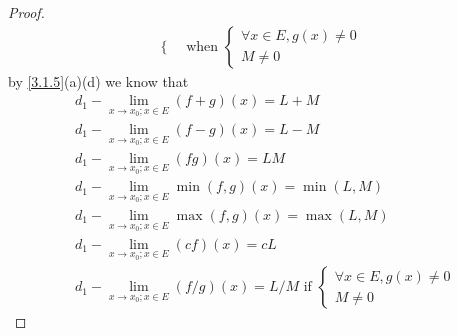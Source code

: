 \begin{proof}
\begin{align*}
\begin{cases}
                                                     \end{cases} \text{ when } \begin{cases}
                                                                                 \forall x \in E, g(x) \neq 0 \\
                                                                                 M \neq 0
                                                                               \end{cases}
  \end{align*}
  by \cref{3.1.5}(a)(d) we know that
  \begin{align*}
     & d_1 - \lim_{x \to x_0 ; x \in E} (f + g)(x) = L + M                                          \\
     & d_1 - \lim_{x \to x_0 ; x \in E} (f - g)(x) = L - M                                          \\
     & d_1 - \lim_{x \to x_0 ; x \in E} (fg)(x) = LM                                                \\
     & d_1 - \lim_{x \to x_0 ; x \in E} \min(f, g)(x) = \min(L, M)                                  \\
     & d_1 - \lim_{x \to x_0 ; x \in E} \max(f, g)(x) = \max(L, M)                                  \\
     & d_1 - \lim_{x \to x_0 ; x \in E} (cf)(x) = cL                                                \\
     & d_1 - \lim_{x \to x_0 ; x \in E} (f / g)(x) = L / M \text{ if } \begin{cases}
                                                                         \forall x \in E, g(x) \neq 0 \\
                                                                         M \neq 0
                                                                       \end{cases}
  \end{align*}
\end{proof}